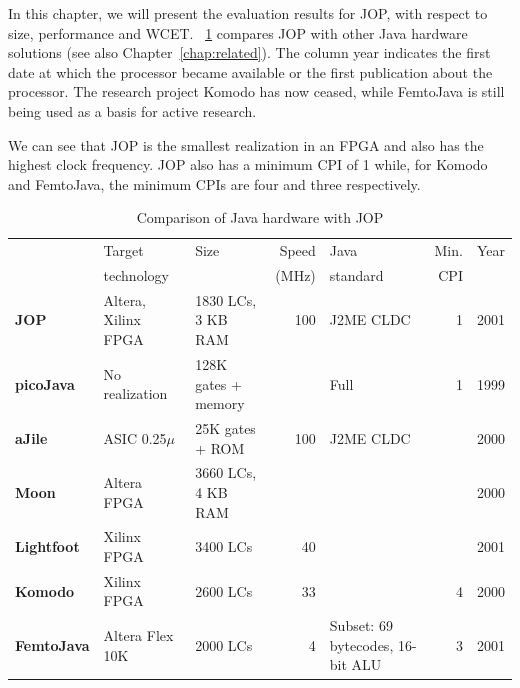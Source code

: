 %


In this chapter, we will present the evaluation results for JOP,
with respect to size, performance and WCET.
\tablename~\ref{tab_results_proc} compares JOP with other Java
hardware solutions (see also Chapter~\ref{chap:related}). The column
year indicates the first date at which the processor became
available or the first publication about the processor. The research
project Komodo has now ceased, while FemtoJava is still being used
as a basis for active research.

We can see that JOP is the smallest realization in an FPGA and also
has the highest clock frequency. JOP also has a minimum CPI of 1
while, for Komodo and FemtoJava, the minimum CPIs are four and three
respectively.

\begin{table}[tbh]
    \centering
{\footnotesize
\begin{tabular}
    {|>{\bfseries}m{1.6cm}|>{\raggedright}m{1.6cm}|>{\raggedright}m{1.7cm}|r|>{\raggedright}m{2cm}|r|r|}

    \hline
         & Target  & Size & Speed & Java     & Min.  & Year \\
         & technology &      & (MHz) & standard & CPI  & \\
    \hline
    JOP & Altera, Xilinx FPGA & 1830 LCs, 3 KB RAM & 100 & J2ME CLDC & 1 & 2001 \\
    \hline
    picoJava & No realization & 128K gates + memory &  & Full & 1 & 1999 \\
    \hline
    aJile & ASIC 0.25$\mu$ & 25K gates + ROM & 100 & J2ME CLDC &  &  2000 \\
    \hline
    Moon & Altera FPGA & 3660 LCs, 4 KB RAM &  &  &  &  2000 \\
    \hline
    Lightfoot & Xilinx FPGA & 3400 LCs & 40 &  &  &  2001 \\
    \hline
    Komodo & Xilinx FPGA & 2600 LCs & 33 & & 4 & 2000 \\
    \hline
    FemtoJava & Altera Flex 10K & 2000 LCs & 4 & Subset: 69 bytecodes, 16-bit ALU & 3  & 2001 \\
    \hline

\end{tabular}
}
    \caption{Comparison of Java hardware with JOP}
    \label{tab_results_proc}
\end{table}

